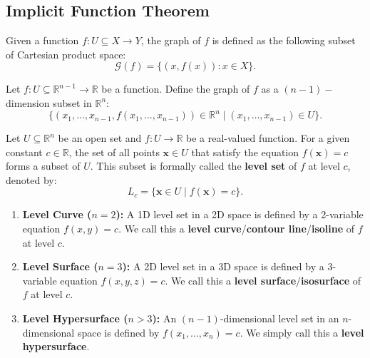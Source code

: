 \subsection{Implicit Function Theorem}

\begin{definition}[Graph]
Given a function $f: U\subseteq X \to Y$, the graph of $f$ is defined as the following subset of Cartesian product space:
$$\mathcal{G}(f) = \{(x,f(x)):x\in X\}.$$
\end{definition}

\begin{example}
Let $f: U \subseteq \mathbb{R}^{n-1} \to \mathbb{R}$ be a function. Define the graph of $f$ as a $(n-1)-$dimension subset in $\mathbb{R}^n$: 
$$\{ (x_1, \ldots, x_{n-1}, f(x_1, \ldots, x_{n-1})) \in \mathbb{R}^n \mid (x_1, \ldots, x_{n-1}) \in U \}.$$
\end{example}


\begin{definition}
Let $U \subseteq \mathbb{R}^n$ be an open set and $f: U \to \mathbb{R}$ be a real-valued function. For a given constant $c \in \mathbb{R}$, the set of all points $\mathbf{x} \in U$ that satisfy the equation $f(\mathbf{x}) = c$ forms a subset of $U$. This subset is formally called the \textbf{level set} of $f$ at level $c$, denoted by:
$$L_c = \{ \mathbf{x} \in U \mid f(\mathbf{x}) = c \}.$$
\end{definition}


\begin{example}
\begin{enumerate}
    \item \textbf{Level Curve ($n=2$):} A 1D level set in a 2D space is defined by a 2-variable equation $f(x,y)=c$. We call this a \textbf{level curve}/\textbf{contour line}/\textbf{isoline} of $f$ at level $c$.
    \item \textbf{Level Surface ($n=3$):} A 2D level set in a 3D space is defined by a 3-variable equation $f(x,y,z)=c$. We call this a \textbf{level surface}/\textbf{isosurface} of $f$ at level $c$.
    \item \textbf{Level Hypersurface ($n>3$):} An $(n-1)$-dimensional level set in an $n$-dimensional space is defined by $f(x_1, \dots, x_n)=c$. We simply call this a \textbf{level hypersurface}.
\end{enumerate}
\end{example}

